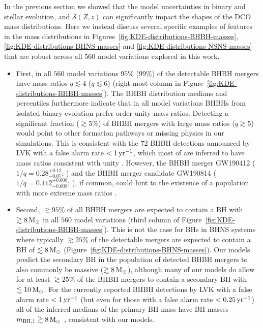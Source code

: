 \documentclass[fleqn,usenatbib]{mnras}
\newcommand{\Msun}{\ensuremath{\,\rm{M}_{\odot}}\xspace}
\newcommand{\yearmin}{\ensuremath{\,\rm{yr}^{-1}}\xspace}
\newcommand{\SFRD}{\ensuremath{\mathcal{S}(Z,z)}\xspace}
\newcommand{\mbhfone}{\ensuremath{m_{\rm{BH,1}}}\xspace}
\newcommand{\qf}{\ensuremath{q}\xspace}
\newcommand{\Nmodels}{\ensuremath{560}\xspace}
\begin{document}
In the previous section we showed that the model uncertainties in binary and stellar evolution, and \SFRD can significantly impact the shapes of the \ac{DCO} mass distributions. Here we instead discuss several specific examples of features in the mass distributions in  Figures~\ref{fig:KDE-distributions-BHBH-masses}, \ref{fig:KDE-distributions-BHNS-masses} and \ref{fig:KDE-distributions-NSNS-masses} that are robust across all \Nmodels model variations explored in this work. 


\begin{itemize}
\item First, in all \Nmodels model variations $95\%$ ($99\%$) of the detectable \ac{BHBH} mergers have mass ratios $\qf\lesssim 4$ ($\qf\lesssim 6$) (right-most column in Figure~\ref{fig:KDE-distributions-BHBH-masses}). The \ac{BHBH} distribution medians and percentiles furthermore indicate that in all model variations \acp{BHBH} from isolated binary evolution prefer order unity mass ratios. Detecting a significant fraction ($\gtrsim5\%$) of \ac{BHBH} mergers with large mass ratios ($\qf\gtrsim5$) would point to other formation pathways or missing physics in our simulations. This is consistent with the 72 \ac{BHBH} detections announced by LVK with a false alarm rate $ < 1 \yearmin$, which most of are inferred to have mass ratios consistent with unity \citep{Abbott:2021GWTC3}. However, the \ac{BHBH} merger GW190412 ($1/\qf = 0.28_{-0.07}^{+0.12}$; \citealt{Abbott:2020gw190412}) and the \ac{BHBH} merger candidate GW190814 ($1/\qf = 0.112_{-0.009}^{+0.008}$; \citealt{Abbott:2020gw190814}), if common, could hint to the existence of a population with more extreme mass ratios \citep[see also][and references therein]{ArcaSedda:2021,Lu:2021,Zevin:2020-lower-mass-gap}. 


\item Second, $\gtrsim 95\%$ of all \ac{BHBH} mergers are expected to contain a \ac{BH} with $\gtrsim 8\Msun$ in all \Nmodels model variations (third column of Figure~\ref{fig:KDE-distributions-BHBH-masses}). This is not the case for \acp{BH} in \ac{BHNS} systems where typically $\gtrsim 25\%$ of the detectable mergers are expected to contain a \ac{BH} of $\lesssim 8\Msun$ (Figure~\ref{fig:KDE-distributions-BHNS-masses}). Our models predict the secondary \ac{BH} in the population of detected \ac{BHBH} mergers to also commonly be massive ($\gtrsim 8\Msun$), although many of our models do allow for at least $\gtrsim 25\%$ of the  \ac{BHBH} mergers to contain a secondary BH with $\lesssim 10\Msun$. For the currently reported \ac{BHBH} detections by LVK with a false alarm rate $ < 1 \yearmin$ (but even for those with a false alarm rate $ < 0.25\yearmin$) all of the inferred medians of the primary \ac{BH} mass have \ac{BH} masses $\mbhfone \gtrsim 8\Msun$ \citep[][Table I]{Abbott:2021GWTC3pop}, consistent with our models. 



\end{itemize}
\end{document}
